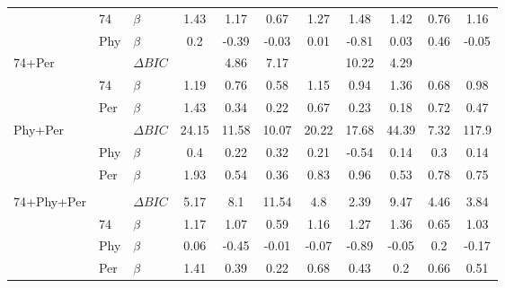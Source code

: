 \begin{table}[!h]
\begin{tabular}[t]{lllcccccccc}
 & 74 & $\beta$ & 1.43 & 1.17 & 0.67 & 1.27 & 1.48 & 1.42 & 0.76 & 1.16\\
 & Phy & $\beta$ & 0.2 & -0.39 & -0.03 & 0.01 & -0.81 & 0.03 & 0.46 & -0.05\\
74+Per &  & $\Delta BIC$ & \cellcolor[HTML]{ffe0f1}{\textbf{0}} & 4.86 & 7.17 & \cellcolor[HTML]{fff9d7}{\textbf{0}} & 10.22 & 4.29 & \cellcolor[HTML]{f7e6ff}{\textbf{0}} & \cellcolor[HTML]{e8e0ef}{\textbf{0}}\\
 & 74 & $\beta$ & 1.19 & 0.76 & 0.58 & 1.15 & 0.94 & 1.36 & 0.68 & 0.98\\
 & Per & $\beta$ & 1.43 & 0.34 & 0.22 & 0.67 & 0.23 & 0.18 & 0.72 & 0.47\\
Phy+Per &  & $\Delta BIC$ & 24.15 & 11.58 & 10.07 & 20.22 & 17.68 & 44.39 & 7.32 & 117.9\\
 & Phy & $\beta$ & 0.4 & 0.22 & 0.32 & 0.21 & -0.54 & 0.14 & 0.3 & 0.14\\
 & Per & $\beta$ & 1.93 & 0.54 & 0.36 & 0.83 & 0.96 & 0.53 & 0.78 & 0.75\\
\addlinespace[0.0em]
\hline
\multicolumn{11}{c}{Full Model}\\
\hline
74+Phy+Per &  & $\Delta BIC$ & 5.17 & 8.1 & 11.54 & 4.8 & 2.39 & 9.47 & 4.46 & 3.84\\
 & 74 & $\beta$ & 1.17 & 1.07 & 0.59 & 1.16 & 1.27 & 1.36 & 0.65 & 1.03\\
 & Phy & $\beta$ & 0.06 & -0.45 & -0.01 & -0.07 & -0.89 & -0.05 & 0.2 & -0.17\\
 & Per & $\beta$ & 1.41 & 0.39 & 0.22 & 0.68 & 0.43 & 0.2 & 0.66 & 0.51\\
\bottomrule
\end{tabular}
\end{table}
